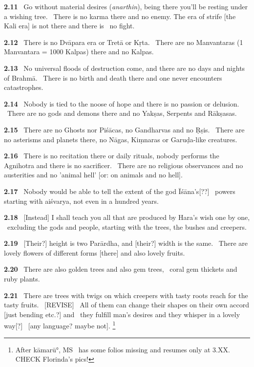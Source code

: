 \documentclass{article}
\newcommand{\skt}[1]{\textit{#1}}
\begin{document}
\textbf{2.11}%
\ Go without material desires (\skt{anarthin}), being there you'll be resting under a wishing tree.%
\ There is no karma there and no enemy. The era of strife [the Kali era] is not there and there is%
\                 no fight.%


\textbf{2.12}%
\ There is no Dvāpara era or Tretā or Kṛta.%
\              There are no Manvantaras (1 Manvantara = 1000 Kalpas) there and no Kalpas.%


\textbf{2.13}%
\ No universal floods of destruction come, and there are no days and nights of Brahmā.%
\ There is no birth and death there and one never encounters catastrophes.%


\textbf{2.14}%
\ Nobody is tied to the noose of hope and there is no passion or delusion.%
\ There are no gods and demons there and no Yakṣas, Serpents and Rākṣasas.%


\textbf{2.15}%
\ There are no Ghosts nor Piśācas, no Gandharvas and no Ṛṣis.%
\ There are no asterisms and planets there, no Nāgas, Kiṃnaras or Garuḍa-like creatures.%


\textbf{2.16}%
\ There is no recitation there or daily rituals, nobody performs the Agnihotra and there is no sacrificer.%
\ There are no religious observances and no austerities and no 'animal hell' [or: on animals and no hell].%


\textbf{2.17}%
\ Nobody would be able to tell the extent of the god Īśāna's[??]%
\ powers starting with aiśvarya, not even in a hundred years.%


\textbf{2.18}%
\ [Instead] I shall teach you all that are produced by Hara's wish one by one,%
\ excluding the gods and people, starting with the trees, the bushes and creepers.%


\textbf{2.19}%
\ [Their?] height is two Parārdha, and [their?] width is the same.%
\              There are lovely flowers of different forms [there] and also lovely fruits.%


\textbf{2.20}%
\ There are also golden trees and also gem trees,%
\              coral gem thickets and ruby plants.%


\textbf{2.21}%
\ There are trees with twigs on which creepers with tasty roots reach for the tasty fruits.%
\              [REVISE]%
\              All of them can change their shapes on their own accord [just bending etc.?] and%
\                         they fulfill man's desires and they whisper in a lovely way[?]%
\                         [any language? maybe not].%
\footnote{After kāmarū°, MS \msCc\ has some folios missing and resumes only at 3.XX. CHECK Florinda's pics! }%
\end{document}
